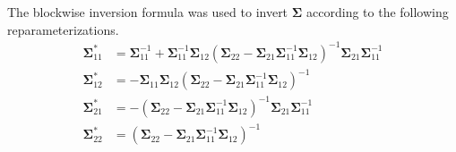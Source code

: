 \documentclass[useAMS,referee]{biom}
\begin{document}
The blockwise inversion formula was used to invert $\boldsymbol\Sigma$ according to the following reparameterizations.
\begin{align*}
\boldsymbol\Sigma_{11}^* & = \boldsymbol\Sigma_{11}^{-1} + \boldsymbol\Sigma_{11}^{-1}\boldsymbol\Sigma_{12}(\boldsymbol\Sigma_{22} - \boldsymbol\Sigma_{21}\boldsymbol\Sigma_{11}^{-1}\boldsymbol\Sigma_{12})^{-1}\boldsymbol\Sigma_{21}\boldsymbol\Sigma_{11}^{-1}\\
\boldsymbol\Sigma_{12}^* & = -\boldsymbol\Sigma_{11} \boldsymbol\Sigma_{12}(\boldsymbol\Sigma_{22}-\boldsymbol\Sigma_{21}\boldsymbol\Sigma_{11}^{-1}\boldsymbol\Sigma_{12})^{-1}\\
\boldsymbol\Sigma_{21}^* & = -(\boldsymbol\Sigma_{22} - \boldsymbol\Sigma_{21}\boldsymbol\Sigma_{11}^{-1}\boldsymbol\Sigma_{12})^{-1}\boldsymbol\Sigma_{21}\boldsymbol\Sigma_{11}^{-1}\\
\boldsymbol\Sigma_{22}^* & = (\boldsymbol\Sigma_{22} - \boldsymbol\Sigma_{21}\boldsymbol\Sigma_{11}^{-1}\boldsymbol\Sigma_{12})^{-1}     
\end{align*}



%
%   
% 

\newpage
\end{document}
